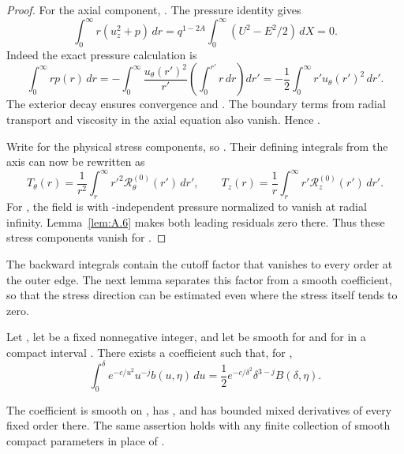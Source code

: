 \begin{proof}
For the axial component, . The pressure identity
 gives
\[
  \int_0^\infty r(u_z^2+p)\,dr
  =q^{1-2A}\int_0^\infty(U^2-E^2/2)\,dX=0.
\]
Indeed the exact pressure calculation is
\[
  \int_0^\infty rp(r)\,dr
  =-\int_0^\infty\frac{u_\theta(r')^2}{r'}
    \left(\int_0^{r'}r\,dr\right)dr'
  =-\frac12\int_0^\infty r'u_\theta(r')^2\,dr'.
\]
The exterior decay  ensures convergence and
. The boundary terms from radial transport and viscosity in the axial equation also vanish.
Hence .

Write  for the physical stress components, so
. Their defining integrals from the axis can now be rewritten as
\begin{equation}
  T_\theta(r)=\frac1{r^2}\int_r^\infty r'^2\mathscr R_\theta^{(0)}(r')\,dr',
  \qquad
  T_z(r)=\frac1r\int_r^\infty r'\mathscr R_z^{(0)}(r')\,dr'.
  \tag{A.46}\label{eq:A.46}
\end{equation}
For , the field is
 with -independent pressure normalized to vanish at
radial infinity. Lemma~\ref{lem:A.6} makes both leading residuals zero there. Thus these stress components vanish for
.
\end{proof}

The backward integrals contain the cutoff factor that vanishes to every order at the outer edge. The next lemma separates this
factor from a smooth coefficient, so that the stress direction can be estimated even where the stress itself tends to zero.

\begin{lemma}\label{lem:A.9}
Let , let  be a fixed nonnegative integer, and let
 be smooth for  and for
 in a compact interval . There exists a coefficient
 such that, for ,
\begin{equation}
  \int_0^\delta e^{-c/u^2}u^{-j}b(u,\eta)\,du
  =\frac12e^{-c/\delta^2}\delta^{3-j}B(\delta,\eta).
  \tag{A.47}\label{eq:A.47}
\end{equation}

%
The coefficient  is smooth on
, has
, and has bounded mixed derivatives of every fixed order there. The same assertion
holds with any finite collection of smooth compact parameters in place of .
\end{lemma}

